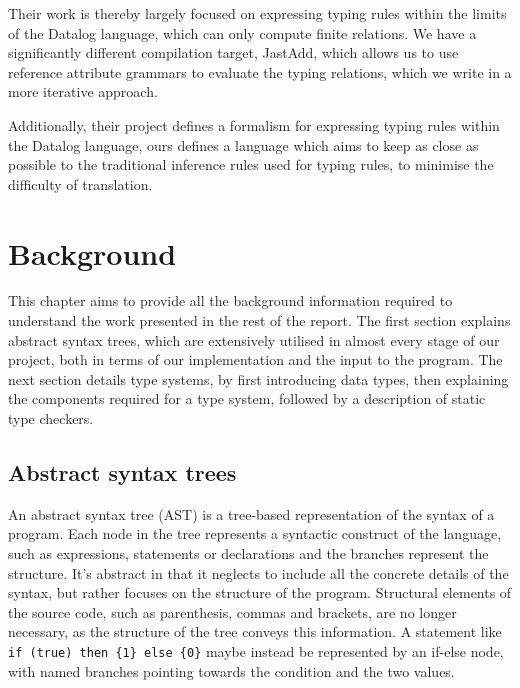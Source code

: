 \documentclass[nofilelist]{cslthse-msc}
\begin{document}
Their work is thereby largely focused on expressing typing rules within the limits of the Datalog language, which can only compute finite relations.
We have a significantly different compilation target, JastAdd, which allows us to use reference attribute grammars to evaluate the typing relations, which we write in a more iterative approach.

Additionally, their project defines a formalism for expressing typing rules within the Datalog language, ours defines a language which aims to keep as close as possible to the traditional inference rules used for typing rules, to minimise the difficulty of translation.


\chapter{Background}
This chapter aims to provide all the background information required to understand the work presented in the rest of the report.
The first section explains abstract syntax trees, which are extensively utilised in almost every stage of our project, both in terms of our implementation and the input to the program.
The next section details type systems, by first introducing data types, then explaining the components required for a type system, followed by a description of static type checkers.

\section{Abstract syntax trees}
An abstract syntax tree (AST) is a tree-based representation of the syntax of a program.
Each node in the tree represents a syntactic construct of the language, such as expressions, statements or declarations and the branches represent the structure.
It's abstract in that it neglects to include all the concrete details of the syntax, but rather focuses on the structure of the program.
Structural elements of the source code, such as parenthesis, commas and brackets, are no longer necessary, as the structure of the tree conveys this information.
A statement like \verb|if (true) then {1} else {0}| maybe instead be represented by an if-else node, with named branches pointing towards the condition and the two values.
\end{document}
